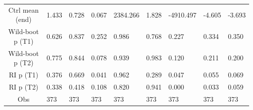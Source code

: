 {\begin{tabular}{@{}S*{8}{P}@{}}
Ctrl mean (end)     &       1.433         &       0.728         &       0.067         &    2384.266         &       1.828         &   -4910.497         &      -4.605         &      -3.693         \\
Wild-boot p (T1)    &       0.626         &       0.837         &       0.252         &       0.986         &       0.768         &       0.227         &       0.334         &       0.350         \\
Wild-boot p (T2)    &       0.775         &       0.844         &       0.078         &       0.939         &       0.983         &       0.120         &       0.211         &       0.200         \\
RI p (T1)           &       0.376         &       0.669         &       0.041         &       0.962         &       0.289         &       0.047         &       0.055         &       0.069         \\
RI p (T2)           &       0.338         &       0.418         &       0.108         &       0.820         &       0.941         &       0.000         &       0.033         &       0.059         \\
Obs                 &         373         &         373         &         373         &         373         &         373         &         373         &         373         &         373         \\
\bottomrule
\end{tabular}
}
